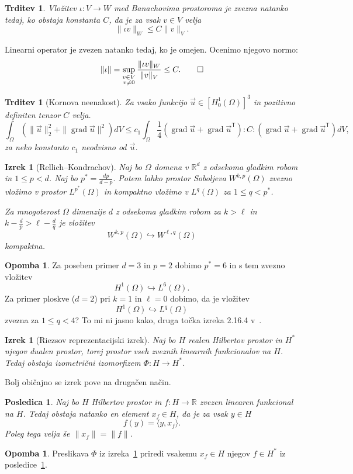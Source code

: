 \documentclass[a4paper,twoside]{article}
\theoremstyle{definition} %
\newtheorem{opomba}[definicija]{Opomba}
\theoremstyle{plain} %
\newtheorem{izrek}[definicija]{Izrek}
\newtheorem{trditev}[definicija]{Trditev}
\newtheorem{posledica}[definicija]{Posledica}
\numberwithin{equation}{section}
\newcommand{\R}{\mathbb R}
\newcommand{\T}{\mathsf{T}}
\newcommand{\grad}{\operatorname{grad}}
\newcommand{\vu}{\vec{u}}
\begin{document}
\begin{trditev}
  Vložitev $\iota\colon V\to W$ med Banachovima prostoroma je zvezna natanko
  tedaj, ko obstaja konstanta $C$, da je za vsak $v\in V$ velja \[ \|\iota v\|_W
  \leq C \|v\|_V. \]
\end{trditev}
\proof
  Linearni operator je zvezen natanko tedaj, ko je omejen. Ocenimo njegovo
  normo:
  \[
    \|\iota\| = \sup_{\substack{v\in V \\ v \neq 0}} \frac{\|\iota
    v\|_W}{\|v\|_V} \leq C. \qedhere
  \]
\endproof

\begin{trditev}[Kornova neenakost]
  \label{trd:korn}
  Za vsako funkcijo $\vu \in [H^1_0(\Omega)]^3$ in pozitivno definiten tenzor $C$ velja.
  \[ \int_{\Omega} (\|\vu\|_2^2 + \|\grad \vu\|^2) dV \leq c_1 \int_{\Omega}
  \frac14 (\grad \vu + \grad \vu^\T) :C: (\grad \vu + \grad \vu^\T)dV, \]
  za neko konstanto $c_1$ neodvisno od $\vu$.
\end{trditev}

\begin{izrek}[Rellich–Kondrachov]
  \label{izr:vlozitev-sobolj}
  Naj bo $\Omega$ domena v $\R^d$ z odsekoma gladkim robom in $1 \leq p < d$.
  Naj bo $p^\ast = \frac{dp}{d-p}.$ Potem lahko prostor Soboljeva
  $W^{k,p}(\Omega)$ zvezno vložimo v prostor $L^{p^\ast}(\Omega)$ in kompaktno
  vložimo v $L^q(\Omega)$ za $1 \leq q < p^\ast$.

  Za mnogoterost $\Omega$ dimenzije $d$ z odsekoma gladkim robom za $k >
  \ell$ in $k - \frac{d}{p} > \ell - \frac{d}{q}$ je vložitev
  \[
    W^{k,p}(\Omega) \hookrightarrow W^{\ell, q}(\Omega)
  \]
  kompaktna.
\end{izrek}
\begin{opomba}
  Za poseben primer $d=3$ in $p=2$ dobimo $p^\ast = 6$ in s tem zvezno vložitev
  \[
    H^1(\Omega) \hookrightarrow L^6(\Omega).
  \]
  Za primer ploskve ($d = 2$) pri $k = 1$ in $\ell = 0$ dobimo, da je vložitev
  \[
    H^1(\Omega) \hookrightarrow L^q(\Omega)
  \]
  zvezna za $1 \leq q < 4$? To mi ni jasno kako, druga točka izreka 2.16.4
  v~\cite{lebedev2009introduction}.
\end{opomba}

\begin{izrek}[Riezsov reprezentacijski izrek]
  \label{izr:riesz-general}
  Naj bo $H$ realen Hilbertov prostor in $H^\ast$ njegov dualen prostor, torej
  prostor vseh zveznih linearnih funkcionalov na $H$. Tedaj obstaja izometrični
  izomorfizem $\Phi\colon H\to H^\ast$.
\end{izrek}
Bolj običajno se izrek pove na drugačen način.
\begin{posledica}
  \label{izr:riesz-useful}
  Naj bo $H$ Hilbertov prostor in $f\colon H\to\R$ zvezen linearen funkcional na $H$.
  Tedaj obstaja natanko en element $x_f \in H$, da je za vsak $y \in H$
  \[ f(y) = \langle y, x_f \rangle. \]
  Poleg tega velja še $\|x_f\| = \|f\|$.
\end{posledica}
\begin{opomba}
  Preslikava $\Phi$ iz izreka~\ref{izr:riesz-general} priredi vsakemu $x_f \in
  H$ njegov $f \in H^\ast$ iz posledice~\ref{izr:riesz-useful}.
\end{opomba}
\end{document}
